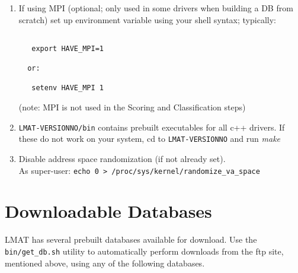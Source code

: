 \documentclass[11pt]{article}
\newcommand{\lmatver}{VERSIONNO}
\begin{document}
\begin{enumerate}

%
%
%
%
%
%


\item

If using MPI (optional; only used in some drivers when building
    a DB from scratch) set up environment variable using your shell syntax; typically: 
\begin{verbatim}

   export HAVE_MPI=1

  or:

   setenv HAVE_MPI 1
\end{verbatim}

   (note: MPI is not used in the Scoring and Classification
    steps)


\item

         \texttt{LMAT-\lmatver/bin} contains prebuilt executables for all c++ drivers.
         If these do not work on your system,
         cd to \texttt{LMAT-\lmatver} and run {\em make}
\item
 Disable address space randomization (if not already set).\\
   As super-user: \texttt{echo 0 > /proc/sys/kernel/randomize\_va\_space}
\end{enumerate}

\section{Downloadable Databases}

LMAT has several prebuilt databases available for download.  Use the \texttt{bin/get\_db.sh} utility to automatically perform downloads from the ftp site, mentioned above, using any of the following databases.  
\end{document}
